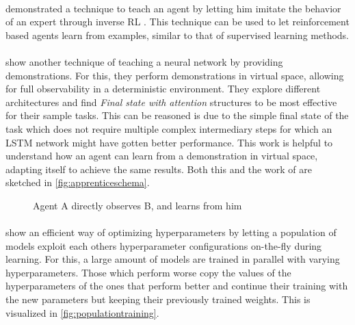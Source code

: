 \documentclass[12pt,a4paper]{article}
\begin{document}
\paragraph{\citeauthor{NG2004Apprentice}}
demonstrated a technique to teach an agent by letting him imitate the behavior of an expert through inverse \ac{RL} \cite{NG2000InvReinf}. This technique can be used to let reinforcement based agents learn from examples, similar to that of supervised learning methods.



\paragraph{\citeauthor{duan2017one}}
show another technique of teaching a neural network by providing demonstrations. For this, they perform demonstrations in virtual space, allowing for full observability in a deterministic environment. They explore different architectures and find \emph{Final state with attention} structures to be most effective for their sample tasks. This can be reasoned is due to the simple final state of the task which does not require multiple complex intermediary steps for which an LSTM network might have gotten better performance.
This work is helpful to understand how an agent can learn from a demonstration in virtual space, adapting itself to achieve the same results. Both this and the work of \citeauthor{NG2004Apprentice} are sketched in \autoref{fig:apprenticeschema}.

\begin{figure}[]
    \centering
    \caption{Agent A directly observes B, and learns from him}
    \label{fig:apprenticeschema}
\end{figure}


\paragraph{\citeauthor{jaderberg2017population}}
 show an efficient way of optimizing hyperparameters by letting a population of models exploit each others hyperparameter configurations on-the-fly during learning. For this, a large amount of models are trained in parallel with varying hyperparameters. Those which perform worse copy the values of the hyperparameters of the ones that perform better and continue their training with the new parameters but keeping their previously trained weights. This is visualized in \autoref{fig:populationtraining}.
\end{document}
